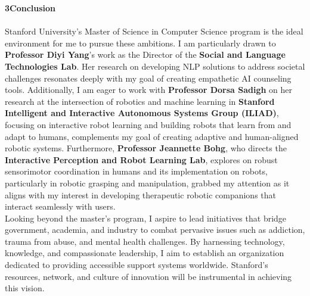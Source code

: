 \documentclass{article}
\begin{document}
\Large\textbf{3\hspace{1em}Conclusion}\normalsize
\\
\\
Stanford University's Master of Science in Computer Science program is the ideal environment for me to pursue these ambitions. I am particularly drawn to \textbf{Professor Diyi Yang}'s work as the Director of the \textbf{Social and Language Technologies Lab}. Her research on developing NLP solutions to address societal challenges resonates deeply with my goal of creating empathetic AI counseling tools\cite{diyiyang}. Additionally, I am eager to work with \textbf{Professor Dorsa Sadigh} on her research at the intersection of robotics and machine learning in \textbf{Stanford Intelligent and Interactive Autonomous Systems Group (ILIAD)}, focusing on interactive robot learning and building robots that learn from and adapt to humans, complements my goal of creating adaptive and human-aligned robotic systems\cite{grannen2024vocal}. Furthermore, \textbf{Professor Jeannette Bohg}, who directs the \textbf{Interactive Perception and Robot Learning Lab}, explores on robust sensorimotor coordination in humans and its implementation on robots, particularly in robotic grasping and manipulation, grabbed my attention as it aligns with my interest in developing therapeutic robotic companions that interact seamlessly with users\cite{srinivasan2024dexmots}.
\\

Looking beyond the master's program, I aspire to lead initiatives that bridge government, academia, and industry to combat pervasive issues such as addiction, trauma from abuse, and mental health challenges. By harnessing technology, knowledge, and compassionate leadership, I aim to establish an organization dedicated to providing accessible support systems worldwide. Stanford's resources, network, and culture of innovation will be instrumental in achieving this vision.



\end{document}
